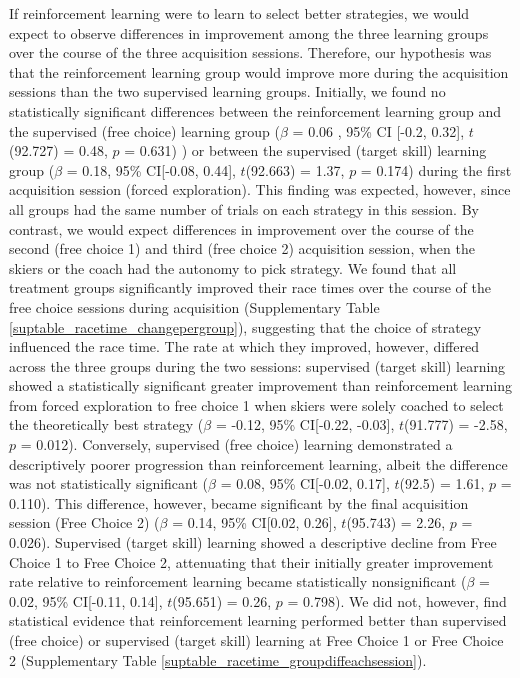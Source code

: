 \documentclass[pdflatex,sn-mathphys-num]{sn-jnl}%
\theoremstyle{thmstyleone}%
\theoremstyle{thmstyletwo}%
\theoremstyle{thmstylethree}%
\begin{document}
If reinforcement learning were to learn to select better strategies, we would expect to observe differences in improvement among the three learning groups over the course of the three acquisition sessions. Therefore, our hypothesis was that the reinforcement learning group would improve more during the acquisition sessions than the two supervised learning groups. Initially, we found no statistically significant differences between the reinforcement learning group and the supervised (free choice) learning group ($\beta$ = 0.06 , 95\% CI [-0.2, 0.32], $t$(92.727) = 0.48, $p$ = 0.631) ) or between the supervised (target skill) learning group ($\beta$ = 0.18, 95\% CI[-0.08, 0.44], $t$(92.663) = 1.37, $p$ = 0.174) during the first acquisition session (forced exploration). This finding was expected, however, since all groups had the same number of trials on each strategy in this session. By contrast, we would expect differences in improvement over the course of the second (free choice 1) and third (free choice 2) acquisition session, when the skiers or the coach had the autonomy to pick strategy. We found that all treatment groups significantly improved their race times over the course of the free choice sessions during acquisition (Supplementary Table \ref{suptable_racetime_changepergroup}), suggesting that the choice of strategy influenced the race time. The rate at which they improved, however, differed across the three groups during the two sessions: supervised (target skill) learning showed a statistically significant greater improvement than reinforcement learning from forced exploration to free choice 1 when skiers were solely coached to select the theoretically best strategy ($\beta$ = -0.12, 95\% CI[-0.22, -0.03], $t$(91.777) = -2.58, $p$ = 0.012). Conversely, supervised (free choice) learning demonstrated a descriptively poorer progression than reinforcement learning, albeit the difference was not statistically significant ($\beta$ = 0.08, 95\% CI[-0.02, 0.17], $t$(92.5) = 1.61, $p$ = 0.110). This difference, however, became significant by the final acquisition session (Free Choice 2) ($\beta$ = 0.14, 95\% CI[0.02, 0.26], $t$(95.743) = 2.26, $p$ = 0.026). Supervised (target skill) learning showed a descriptive decline from Free Choice 1 to Free Choice 2, attenuating that their initially greater improvement rate relative to reinforcement learning became statistically nonsignificant  ($\beta$ = 0.02, 95\% CI[-0.11, 0.14], $t$(95.651) = 0.26, $p$ = 0.798). We did not, however, find statistical evidence that reinforcement learning performed better than supervised (free choice) or supervised (target skill) learning at Free Choice 1 or Free Choice 2 (Supplementary Table \ref{suptable_racetime_groupdiffeachsession}). 
\end{document}
